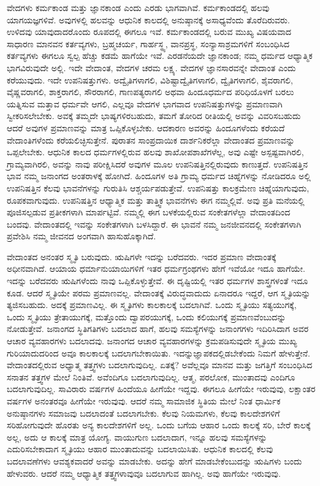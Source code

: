 ವೇದಗಳು ಕರ್ಮಕಾಂಡ ಮತ್ತು ಜ್ಞಾನಕಾಂಡ ಎಂದು ಎರಡು ಭಾಗವಾಗಿವೆ. ಕರ್ಮಕಾಂಡದಲ್ಲಿ ಹಲವು ಯಾಗಯಜ್ಞಗಳಿವೆ. ಅವುಗಳಲ್ಲಿ ಹಲವನ್ನು ಆಧುನಿಕ ಕಾಲದಲ್ಲಿ ಅನುಷ್ಠಾನಕ್ಕೆ ಅಸಾಧ್ಯವೆಂದು ತೊರೆದಿರುವರು. ಉಳಿದವು ಯಾವುದಾದರೊಂದು ರೂಪದಲ್ಲಿ ಈಗಲೂ ಇವೆ. ಕರ್ಮಕಾಂಡದಲ್ಲಿ ಬರುವ ಮುಖ್ಯ ವಿಷಯವಾದ ಸಾಧಾರಣ ಮಾನವನ ಕರ್ತವ್ಯಗಳು, ಬ್ರಹ್ಮಚರ್ಯ, ಗಾರ್ಹಸ್ಥ್ಯ, ವಾನಪ್ರಸ್ಥ, ಸಂನ್ಯಾಸಾಶ್ರಮಗಳಿಗೆ ಸಂಬಂಧಿಸಿದ ಕರ್ತವ್ಯಗಳು ಈಗಲೂ ಸ್ವಲ್ಪ ಹೆಚ್ಚು ಕಡಮೆ ಹಾಗೆಯೇ ಇವೆ. ಎರಡನೆಯದೇ ಜ್ಞಾನಕಾಂಡ; ನಮ್ಮ ಧರ್ಮದ ಆಧ್ಯಾತ್ಮಿಕ ಭಾಗವಿರುವುದೇ ಅಲ್ಲಿ. ಇದೇ ವೇದಾಂತ, ವೇದಗಳ ಚರಮ ಲಕ್ಷ್ಯ. ವೇದಗಳ ಜ್ಞಾನಸಾರವನ್ನೇ ವೇದಾಂತ ಎಂದು ಕರೆಯುವುದು. ಇದೇ ಉಪನಿಷತ್ತುಗಳು. ಅದ್ವೈತಿಗಳಾಗಲಿ, ವಿಶಿಷ್ಟಾದ್ವೈತಿಗಳಾಗಲಿ, ದ್ವೈತಿಗಳಾಗಲಿ, ಶೈವರಾಗಲಿ, ವೈಷ್ಣವರಾಗಲಿ, ಶಾಕ್ತರಾಗಲಿ, ಸೌರರಾಗಲಿ, ಗಾಣಪತ್ಯರಾಗಲಿ ಅಥವಾ ಹಿಂದೂಧರ್ಮದ ಪರಿಧಿಯೊಳಗೆ ಬರಲು ಯತ್ನಿಸುವ ಮತ್ತಾವ ಧರ್ಮವೇ ಆಗಲಿ, ಎಲ್ಲವೂ ವೇದಗಳ ಭಾಗವಾದ ಉಪನಿಷತ್ತುಗಳನ್ನು ಪ್ರಮಾಣವಾಗಿ ಸ್ವೀಕರಿಸಲೇಬೇಕು. ಅವಕ್ಕೆ ತಮ್ಮದೇ ಭಾಷ್ಯಗಳಿರಬಹುದು, ತಮಗೆ ತೋರಿದ ರೀತಿಯಲ್ಲಿ ಅವನ್ನು ವಿವರಿಸಬಹುದು ಆದರೆ ಅವುಗಳ ಪ್ರಮಾಣವನ್ನು ಮಾತ್ರ ಒಪ್ಪಿಕೊಳ್ಳಬೇಕು. ಆದಕಾರಣ ಅವರನ್ನು ಹಿಂದೂಗಳೆಂದು ಕರೆಯದೆ ವೇದಾಂತಿಗಳೆಂದು ಕರೆಯಲಿಚ್ಛಿಸುತ್ತೇನೆ. ಪುರಾತನ ಸಾಂಪ್ರದಾಯಿಕ ದಾರ್ಶನಿಕರೆಲ್ಲಾ ವೇದಾಂತದ ಪ್ರಮಾಣವನ್ನು ಒಪ್ಪಲೇಬೇಕು. ಆಧುನಿಕ ಕಾಲದ ಧರ್ಮಗಳಲ್ಲಿರುವ ಹಲವು ಶಾಖೋಪಶಾಖೆಗಳೆಲ್ಲ, ಅವು ಎಷ್ಟೇ ಅಸ್ಪಷ್ಟವಾಗಿರಲಿ, ಗ್ರಾಮ್ಯವಾಗಿರಲಿ, ಅವನ್ನು ನಾವು ಪರೀಕ್ಷಿಸಿದರೆ ಅವುಗಳ ಮೂಲ ಉಪನಿಷತ್ತಿನಲ್ಲಿರುವುದು ಕಾಣುತ್ತದೆ. ಉಪನಿಷತ್ತಿನ ಭಾವ ನಮ್ಮ ಜನಾಂಗದ ಅಂತರಾಳಕ್ಕೆ ಹೋಗಿದೆ. ಹಿಂದೂಗಳ ಅತಿ ಗ್ರಾಮ್ಯ ಧರ್ಮದ ಚಿಹ್ನೆಗಳನ್ನು ನೋಡಿದರೂ ಅಲ್ಲಿ ಉಪನಿಷತ್ತಿನ ಕೆಲವು ಭಾವನೆಗಳನ್ನು ಗುರುತಿಸಿ ಆಶ್ಚರ್ಯಪಡುತ್ತೇವೆ. ಉಪನಿಷತ್ತು ಕಾಲಕ್ರಮೇಣ ಚಿಹ್ನೆಯಾಗುವುದು, ರೂಪಕವಾಗುವುದು. ಉಪನಿಷತ್ತಿನ ಆಧ್ಯಾತ್ಮಿಕ ಮತ್ತು ತಾತ್ತ್ವಿಕ ಭಾವನೆಗಳು ಈಗ ನಮ್ಮಲ್ಲಿವೆ. ಅವು ಪ್ರತಿ ಮನೆಯಲ್ಲಿ ಪೂಜಿಸಲ್ಪಡುವ ಪ್ರತೀಕಗಳಾಗಿ ಮಾರ್ಪಟ್ಟಿವೆ. ನಮ್ಮಲ್ಲಿ ಈಗ ಬಳಕೆಯಲ್ಲಿರುವ ಸಂಕೇತಗಳೆಲ್ಲಾ ವೇದಾಂತದಿಂದ ಬಂದವು. ವೇದಾಂತದಲ್ಲಿ ಇವನ್ನು ಸಂಕೇತಗಳಾಗಿ ಬಳಸಿದ್ದಾರೆ. ಈ ಭಾವನೆ ನಮ್ಮ ಜನಜೀವನದಲ್ಲಿ ಸಂಕೇತಗಳಾಗಿ ಪ್ರವೇಶಿಸಿ ನಮ್ಮ ಜೀವನದ ಅಂಗವಾಗಿ ಹಾಸುಹೊಕ್ಕಾಗಿದೆ.

ವೇದಾಂತದ ಅನಂತರ ಸ್ಮೃತಿ ಬರುವುದು. ಋಷಿಗಳೇ ಇದನ್ನು ಬರೆದವರು. ಇದರ ಪ್ರಮಾಣ ವೇದಾಂತಕ್ಕೆ ಅಧೀನವಾಗಿದೆ. ಆಯಾಯ ಧರ್ಮಾನುಯಾಯಿಗಳಿಗೆ ಇತರ ಧರ್ಮಗ್ರಂಥಗಳು ಹೇಗೆ ಇವೆಯೋ ಇದೂ ಹಾಗೆಯೇ. ಇದನ್ನು ಬರೆದವರು ಋಷಿಗಳೆಂದು ನಾವು ಒಪ್ಪಿಕೊಳ್ಳುತ್ತೇವೆ. ಈ ದೃಷ್ಟಿಯಲ್ಲಿ ಇತರ ಧರ್ಮಗಳ ಶಾಸ್ತ್ರಗಳಂತೆ ಇದೂ ಕೂಡ. ಆದರೆ ಸ್ಮೃತಿಯೇ ಪರಮ ಪ್ರಮಾಣವಲ್ಲ. ವೇದಾಂತಕ್ಕೆ ವಿರುದ್ಧವಾದುದು ಏನಾದರೂ ಇದ್ದರೆ, ಆಗ ಸ್ಮೃತಿಯನ್ನು ತ್ಯಜಿಸಬಹುದು. ಅದಕ್ಕೆ ಪ್ರಮಾಣವಿಲ್ಲ. ಈ ಸ್ಮೃತಿಗಳು ಕಾಲಕಾಲಕ್ಕೆ ಬದಲಾಗಿವೆ. ಒಂದು ಸ್ಮೃತಿಯು ಸತ್ಯಯುಗಕ್ಕೆ, ಒಂದು ಸ್ಮೃತಿಯು ತ್ರೇತಾಯುಗಕ್ಕೆ, ಮತ್ತೊಂದು ದ್ವಾಪರಯುಗಕ್ಕೆ, ಒಂದು ಕಲಿಯುಗಕ್ಕೆ ಪ್ರಮಾಣವೆಂಬುದನ್ನು ನೋಡುತ್ತೇವೆ. ಜನಾಂಗದ ಸ್ಥಿತಿಗತಿಗಳು ಬದಲಾದ ಹಾಗೆ, ಹಲವು ಸಮಸ್ಯೆಗಳನ್ನು ಜನಾಂಗಗಳು ಇದಿರಿಸಿದಾಗ ಅವರ ಆಚಾರ ವ್ಯವಹಾರಗಳು ಬದಲಾದವು. ಜನಾಂಗದ ಆಚಾರ ವ್ಯವಹಾರಗಳನ್ನು ಕ್ರಮಪಡಿಸುವುದೇ ಸ್ಮೃತಿಯ ಮುಖ್ಯ ಗುರಿಯಾದುದರಿಂದ ಅವೂ ಕಾಲಕಾಲಕ್ಕೆ ಬದಲಾಗಬೇಕಾಯಿತು. ಇದನ್ನು\break ಜ್ಞಾಪಕದಲ್ಲಿಡಬೇಕೆಂದು ನಿಮಗೆ ಹೇಳುತ್ತೇನೆ. ವೇದಾಂತದಲ್ಲಿರುವ ಅಧ್ಯಾತ್ಮ ತತ್ತ್ವಗಳು ಬದಲಾಗುವುದಿಲ್ಲ. ಏತಕ್ಕೆ? ಅವೆಲ್ಲವೂ ಮಾನವ ಮತ್ತು ಜಗತ್ತಿಗೆ ಸಂಬಂಧಿಸಿದ ಸನಾತನ ತತ್ತ್ವಗಳ ಮೇಲೆ ನಿಂತಿವೆ. ಅವೆಂದಿಗೂ ಬದಲಾಗುವುದಿಲ್ಲ. ಆತ್ಮ, ಪರಲೋಕ, ಮುಂತಾದವು ಎಂದಿಗೂ ಬದಲಾಗುವುದಿಲ್ಲ. ಸಾವಿರಾರು ವರ್ಷಗಳ ಹಿಂದೆಯೂ ಹೀಗೆಯೇ ಇದ್ದವು. ಈಗಲೂ ಹೀಗೆಯೇ ಇರುವುವು, ಲಕ್ಷಾಂತರ ವರ್ಷಗಳ ಅನಂತರವೂ ಹೀಗೆಯೇ ಇರುವುವು. ಆದರೆ ನಮ್ಮ ಸಾಮಾಜಿಕ ಸ್ಥಿತಿಯ ಮೇಲೆ ನಿಂತ ಧಾರ್ಮಿಕ ಅನುಷ್ಠಾನಗಳು ಸಮಾಜವು ಬದಲಾದಂತೆ ಬದಲಾಗಬೇಕು. ಕೆಲವು ನಿಯಮಗಳು, ಕೆಲವು ಕಾಲದೇಶಗಳಿಗೆ ಸರಿಹೋಗುವುದೇ ಹೊರತು ಅನ್ಯ ಕಾಲದೇಶಗಳಿಗೆ ಅಲ್ಲ. ಒಂದು ಬಗೆಯ ಆಹಾರ ಒಂದು ಕಾಲಕ್ಕೆ ಸರಿ, ಬೇರೆ ಕಾಲಕ್ಕೆ ಅಲ್ಲ, ಅದು ಆ ಕಾಲಕ್ಕೆ ಮಾತ್ರ ಯೋಗ್ಯ. ವಾಯುಗುಣ ಬದಲಾದಾಗ, ಇನ್ನೂ ಹಲವು ಸಮಸ್ಯೆಗಳನ್ನು ಎದುರಿಸಬೇಕಾದಾಗ ಸ್ಮೃತಿಯು ಆಹಾರ ಮುಂತಾದುವನ್ನು ಬದಲಾಯಿಸಿತು. ಆಧುನಿಕ ಕಾಲದಲ್ಲಿ ಕೆಲವು ಬದಲಾವಣೆಗಳು ಆವಶ್ಯಕವಾದರೆ ಅವನ್ನು ಮಾಡಬೇಕು. ಅದನ್ನು ಹೇಗೆ ಮಾಡಬೇಕೆಂಬುದನ್ನು ಋಷಿಗಳು ಬಂದು ಹೇಳುವರು. ಆದರೆ ನಮ್ಮ ಆಧ್ಯಾತ್ಮಿಕ ತತ್ತ್ವಗಳಾವುವೂ ಬದಲಾಗುವ ಹಾಗಿಲ್ಲ. ಅವು ಹಾಗೆಯೇ ಇರುವುವು.

